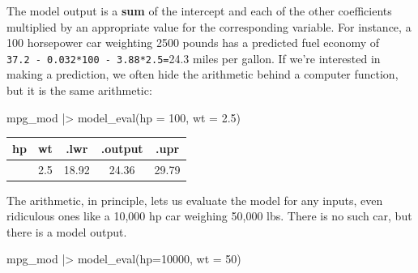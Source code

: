 \documentclass[
  letterpaper,
  DIV=11,
  numbers=noendperiod,
  oneside]{scrartcl}
\newenvironment{Shaded}{\begin{snugshade}}{\end{snugshade}}
\newcommand{\AttributeTok}[1]{\textcolor[rgb]{0.40,0.45,0.13}{#1}}
\newcommand{\DecValTok}[1]{\textcolor[rgb]{0.68,0.00,0.00}{#1}}
\newcommand{\FloatTok}[1]{\textcolor[rgb]{0.68,0.00,0.00}{#1}}
\newcommand{\FunctionTok}[1]{\textcolor[rgb]{0.28,0.35,0.67}{#1}}
\newcommand{\NormalTok}[1]{\textcolor[rgb]{0.00,0.23,0.31}{#1}}
\newcommand{\SpecialCharTok}[1]{\textcolor[rgb]{0.37,0.37,0.37}{#1}}
\begin{document}
The model output is a \textbf{sum} of the intercept and each of the
other coefficients multiplied by an appropriate value for the
corresponding variable. For instance, a 100 horsepower car weighting
2500 pounds has a predicted fuel economy of
\texttt{37.2\ -\ 0.032*100\ -\ 3.88*2.5=}24.3 miles per gallon.
{}
If we're interested in making a prediction, we often hide the arithmetic
behind a computer function, but it is the same arithmetic:

\begin{Shaded}
\begin{Highlighting}[]
\NormalTok{mpg\_mod }\SpecialCharTok{|\textgreater{}} \FunctionTok{model\_eval}\NormalTok{(}\AttributeTok{hp =} \DecValTok{100}\NormalTok{, }\AttributeTok{wt =} \FloatTok{2.5}\NormalTok{)}
\end{Highlighting}
\end{Shaded}

\begin{longtable}[]{@{}ccccc@{}}
\toprule\noalign{}
hp & wt & .lwr & .output & .upr \\
\midrule\noalign{}
\endhead
\bottomrule\noalign{}
\endlastfoot
100 & 2.5 & 18.92 & 24.36 & 29.79 \\
\end{longtable}

The arithmetic, in principle, lets us evaluate the model for any inputs,
even ridiculous ones like a 10,000 hp car weighing 50,000 lbs. There is
no such car, but there is a model output.
{}

\begin{Shaded}
\begin{Highlighting}[]
\NormalTok{mpg\_mod }\SpecialCharTok{|\textgreater{}} \FunctionTok{model\_eval}\NormalTok{(}\AttributeTok{hp=}\DecValTok{10000}\NormalTok{, }\AttributeTok{wt =} \DecValTok{50}\NormalTok{)}
\end{Highlighting}
\end{Shaded}
\end{document}
